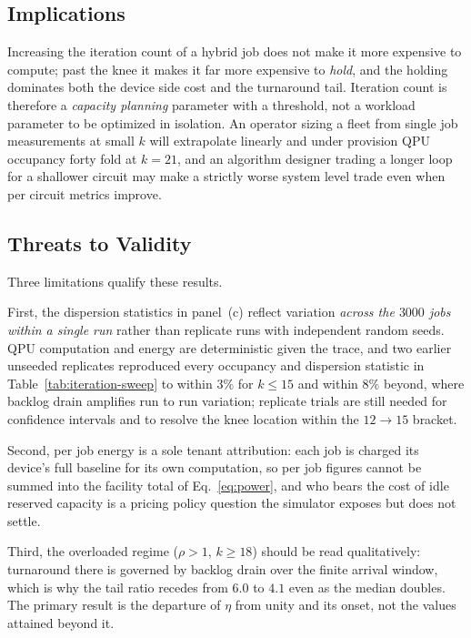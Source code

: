 \subsection{Implications}
\label{sec:iter-implications}

Increasing the iteration count of a hybrid job does not make it more expensive to compute; past the knee it makes it far more expensive to \emph{hold}, and the holding dominates both the device side cost and the turnaround tail. Iteration count is therefore a \emph{capacity planning} parameter with a threshold, not a workload parameter to be optimized in isolation. An operator sizing a fleet from single job measurements at small $k$ will extrapolate linearly and under provision QPU occupancy forty fold at $k=21$, and an algorithm designer trading a longer loop for a shallower circuit may make a strictly worse system level trade even when per circuit metrics improve.


\subsection{Threats to Validity}
\label{sec:iter-validity}

Three limitations qualify these results.

First, the dispersion statistics in panel~(c) reflect variation \emph{across the $3000$ jobs within a single run} rather than replicate runs with independent random seeds. QPU computation and energy are deterministic given the trace, and two earlier unseeded replicates reproduced every occupancy and dispersion statistic in Table~\ref{tab:iteration-sweep} to within $3\%$ for $k \le 15$ and within $8\%$ beyond, where backlog drain amplifies run to run variation; replicate trials are still needed for confidence intervals and to resolve the knee location within the $12 \to 15$ bracket.

Second, per job energy is a sole tenant attribution: each job is charged its device's full baseline for its own computation, so per job figures cannot be summed into the facility total of Eq.~\eqref{eq:power}, and who bears the cost of idle reserved capacity is a pricing policy question the simulator exposes but does not settle.

Third, the overloaded regime ($\rho > 1$, $k \ge 18$) should be read qualitatively: turnaround there is governed by backlog drain over the finite arrival window, which is why the tail ratio recedes from $6.0$ to $4.1$ even as the median doubles. The primary result is the departure of $\eta$ from unity and its onset, not the values attained beyond it.
